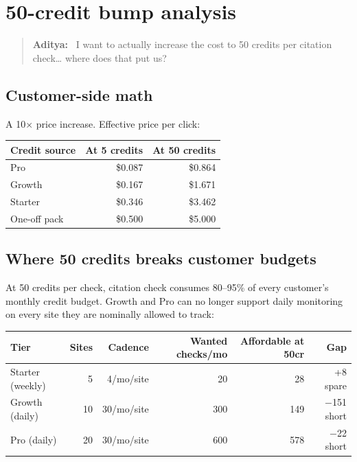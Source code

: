 \documentclass[11pt,letterpaper]{article}
\newenvironment{userturn}
  {\begin{quote}\small\color{brand}\textbf{Aditya:}~}
  {\end{quote}}
\newcommand{\warn}[1]{\textcolor{warn}{#1}}
\begin{document}
\section{50-credit bump analysis}

\begin{userturn}
I want to actually increase the cost to 50 credits per citation check\ldots
where does that put us?
\end{userturn}

\subsection{Customer-side math}

A 10$\times$ price increase. Effective price per click:

\begin{center}
\begin{tabular}{@{}lrr@{}}
\toprule
\textbf{Credit source} & \textbf{At 5 credits} & \textbf{At 50 credits} \\
\midrule
Pro          & \$0.087 & \$0.864 \\
Growth       & \$0.167 & \$1.671 \\
Starter      & \$0.346 & \$3.462 \\
One-off pack & \$0.500 & \$5.000 \\
\bottomrule
\end{tabular}
\end{center}

\subsection{Where 50 credits breaks customer budgets}

At 50 credits per check, citation check consumes 80--95\% of every
customer's monthly credit budget. Growth and Pro can no longer support
daily monitoring on every site they are nominally allowed to track:

\begin{center}
\begin{tabular}{@{}lrrrrr@{}}
\toprule
\textbf{Tier} & \textbf{Sites} & \textbf{Cadence} & \textbf{Wanted checks/mo} & \textbf{Affordable at 50cr} & \textbf{Gap} \\
\midrule
Starter (weekly) & 5  & 4/mo/site     & 20          & 28  & +8 spare \\
Growth (daily)   & 10 & 30/mo/site    & 300         & 149 & \warn{$-$151 short} \\
Pro (daily)      & 20 & 30/mo/site    & 600         & 578 & \warn{$-$22 short} \\
\bottomrule
\end{tabular}
\end{center}
\end{document}
